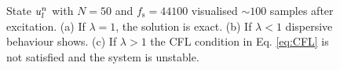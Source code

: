 \begin{figure}[t]
    \caption{State $u_l^n$ with $N = 50$ and $f_\text{s} = 44100$ visualised $\sim\!100$ samples after excitation. (a) If $\lambda = 1$, the solution is exact. (b) If $\lambda < 1$ dispersive behaviour shows. (c) If $\lambda > 1$ the CFL condition in Eq. \eqref{eq:CFL} is not satisfied and the system is unstable.\label{fig:1DWaveDispersion}}
\end{figure}

